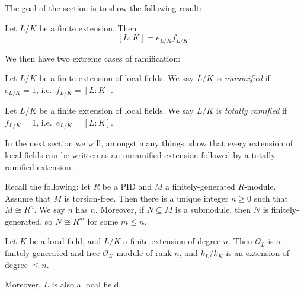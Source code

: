 \documentclass[a4paper]{article}
\begin{document}
The goal of the section is to show the following result:
\begin{thm}
  Let $L/K$ be a finite extension. Then
  \[
    [L:K] = e_{L/K}f_{L/K}.
  \]
\end{thm}

We then have two extreme cases of ramification:
\begin{defi}
  Let $L/K$ be a finite extension of local fields. We say $L/K$ is \emph{unramified} if $e_{L/K} = 1$, i.e.\ $f_{L/K} = [L:K]$.
\end{defi}

\begin{defi}
  Let $L/K$ be a finite extension of local fields. We say $L/K$ is \emph{totally ramified} if $f_{L/K} = 1$, i.e.\ $e_{L/K} = [L:K]$.
\end{defi}

In the next section we will, amongst many things, show that every extension of local fields can be written as an unramified extension followed by a totally ramified extension.

Recall the following: let $R$ be a PID and $M$ a finitely-generated $R$-module. Assume that $M$ is torsion-free. Then there is a unique integer $n \geq 0$ such that $M \cong R^n$. We say $n$ has  $n$. Moreover, if $N \subseteq M$ is a submodule, then $N$ is finitely-generated, so $N\cong R^m$ for some $m \leq n$.

\begin{prop}
  Let $K$ be a local field, and $L/K$ a finite extension of degree $n$. Then $\mathcal{O}_L$ is a finitely-generated and free $\mathcal{O}_K$ module of rank $n$, and $k_L/k_K$ is an extension of degree $\leq n$.

  Moreover, $L$ is also a local field.
\end{prop}
\end{document}
